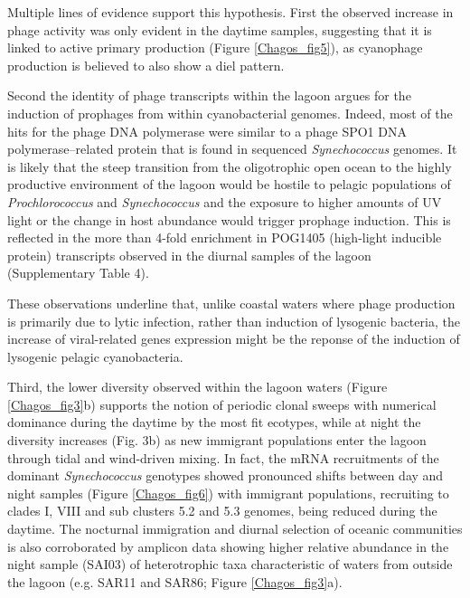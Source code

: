 Multiple lines of evidence support this hypothesis. First the observed increase in phage activity was only evident in the daytime samples, suggesting that it is linked to active primary production (Figure \ref{Chagos_fig5}), as cyanophage production is believed to also show a diel pattern. \cite{kao_diel_2005}

Second the identity of phage transcripts within the lagoon argues for the induction of prophages from within cyanobacterial genomes. Indeed, most of the hits for the phage DNA polymerase were similar to a phage SPO1 DNA polymerase–related protein that is found in sequenced {\em Synechococcus} genomes. It is likely that the steep transition from the oligotrophic open ocean to the highly productive environment of the lagoon would be hostile to pelagic populations of {\em Prochlorococcus} and {\em Synechococcus} and the exposure to higher amounts of UV light or the change in host abundance \cite{paul_prophages_2008} would trigger prophage induction. This is reflected in the more than 4-fold enrichment in POG1405 (high-light inducible protein) transcripts observed in the diurnal samples of the lagoon (Supplementary Table 4).

These observations underline that, unlike coastal waters \cite{wilcox_bacterial-viruses_1994, weinbauer_lysogeny_1999} where phage production is primarily due to lytic infection, rather than induction of lysogenic bacteria, the increase of viral-related genes expression might be the reponse of the induction of lysogenic pelagic cyanobacteria.

Third, the lower diversity observed within the lagoon waters (Figure \ref{Chagos_fig3}b) supports the notion of periodic clonal sweeps \cite{rodriguez-brito_application_2006} with numerical dominance during the daytime by the most fit ecotypes, while at night the diversity increases (Fig. 3b) as new immigrant populations enter the lagoon through tidal and wind-driven mixing. In fact, the mRNA recruitments of the dominant {\em Synechococcus} genotypes showed pronounced shifts between day and night samples (Figure \ref{Chagos_fig6}) with immigrant populations, recruiting to clades I, VIII and sub clusters 5.2 and 5.3 genomes, being reduced during the daytime. The nocturnal immigration and diurnal selection of oceanic communities is also corroborated by amplicon data showing higher relative abundance in the night sample (SAI03) of heterotrophic taxa characteristic of waters from outside the lagoon (e.g. SAR11 and SAR86; Figure \ref{Chagos_fig3}a).

